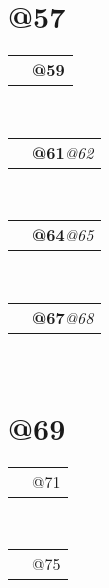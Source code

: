 \documentclass[11pt,a4paper,sans]{moderncv}
\makeatletter
\renewcommand*{\cvlanguage}[3]{%
  \cvline{#1}{\textbf{#2}\hspace*{\separatorcolumnwidth}\emph{#3}}}
\renewcommand*{\cvline}[3][.25em]{%
	  \begin{tabular}{@{}p{\hintscolumnwidth}@{\hspace{\separatorcolumnwidth}}p{\maincolumnwidth}@{}}%
          \centering\hintfont{#2} &{#3}%
	  \end{tabular}\\[#1]}
\makeatother
\begin{document}
\section{@57}
\cvlanguage{@58}{@59}{}
\cvlanguage{@60}{@61}{@62}
\cvlanguage{@63}{@64}{@65}
\cvlanguage{@66}{@67}{@68}
\SECTIONSPACE
\section{@69}
\cvline{@70}{@71 \newline{\emph{@72}} \newline{\emph{@73}}\ENTRYSPACE}
\cvline{@74}{@75 \newline{\emph{@76}} \newline{\emph{@77}}}
\end{document}
